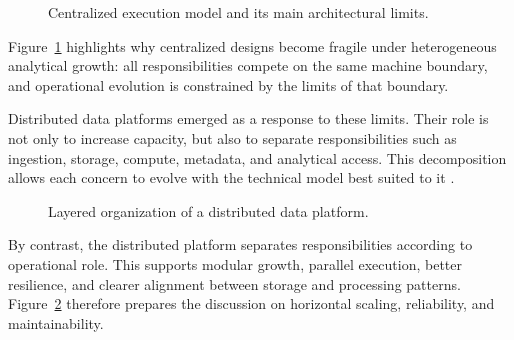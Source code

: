\begin{figure}[H]
  \centering
  
  \caption{Centralized execution model and its main architectural limits.}
  \label{fig:centralized-architecture}
\end{figure}

Figure~\ref{fig:centralized-architecture} highlights why centralized designs become fragile under heterogeneous analytical growth: all responsibilities compete on the same machine boundary, and operational evolution is constrained by the limits of that boundary.

Distributed data platforms emerged as a response to these limits. Their role is not only to increase capacity, but also to separate responsibilities such as ingestion, storage, compute, metadata, and analytical access. This decomposition allows each concern to evolve with the technical model best suited to it \cite{kleppmann2017ddia}.

\begin{figure}[H]
  \centering
  
  \caption{Layered organization of a distributed data platform.}
  \label{fig:distributed-data-platform}
\end{figure}

By contrast, the distributed platform separates responsibilities according to operational role. This supports modular growth, parallel execution, better resilience, and clearer alignment between storage and processing patterns. Figure~\ref{fig:distributed-data-platform} therefore prepares the discussion on horizontal scaling, reliability, and maintainability.

